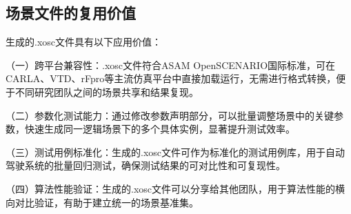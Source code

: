 \subsection{场景文件的复用价值}
生成的.xosc文件具有以下应用价值：

（一）跨平台兼容性：.xosc文件符合ASAM OpenSCENARIO国际标准，可在CARLA、VTD、rFpro等主流仿真平台中直接加载运行，无需进行格式转换，便于不同研究团队之间的场景共享和结果复现。

（二）参数化测试能力：通过修改参数声明部分，可以批量调整场景中的关键参数，快速生成同一逻辑场景下的多个具体实例，显著提升测试效率。

（三）测试用例标准化：生成的.xosc文件可作为标准化的测试用例库，用于自动驾驶系统的批量回归测试，确保测试结果的可对比性和可复现性。

（四）算法性能验证：生成的.xosc文件可以分享给其他团队，用于算法性能的横向对比验证，有助于建立统一的场景基准集。

